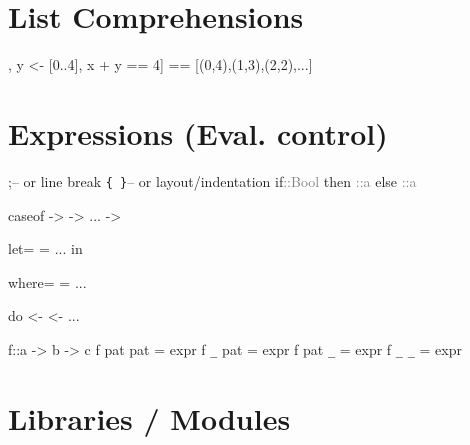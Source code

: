 \documentclass{refcard}
\begin{document}
\section{List Comprehensions}

\begin{ldesc}
	\li[pairs where sum=4] [(x,y) | \li
	                       \s\s{}x <- [0..4], \li
						   \s\s{}y <- [0..4], \li
						   \s\s{}x + y == 4]  \li
	                       == [(0,4),(1,3),(2,2),...]
\end{ldesc}


\vspace{45mm} %


\section{Expressions (Eval. control)}

\begin{ldesc}
	         ;\s\s\s\s-- or line break
	          \verb+{ }+\s\s-- or layout/indentation
	\li
	\li[if expression]
		if\s{}\s\textcolor{gray}{::\s{}Bool} \li
		\s\s{}then\s{} \textcolor{gray}{::\s{}a} \li
		\s\s{}else\s{} \textcolor{gray}{::\s{}a} \li

		case\s{}\s{}of     \li
		\s\s{}\s->\s{}   \li
		\s\s{}\s->\s{}   \li
		\s\s... \li
		\s\s{}\I{\_}\s->\s{}   \li

		let\s{}= \li
		\s\s\s\s{}= \li
		\s\s\s\s... \li
		in\s{} \li

		 \li
		where\s{}= \li
		\s\s\s\s\s\s{}= \li
		\s\s\s\s\s\s... \li

	\li[do notation]
		do       \li
		\s\s\s{} <-  \li
		\s\s\s{} \li
		\s\s\s{} <-  \li
		\s\s\s{}... \li

		f\s::\s{}a -> b -> c 
		f pat pat = expr \li
		f \verb+_+\s\s{} pat = expr \li
		f pat \verb+_+\s\s{} = expr \li
		f \verb+_+\s\s{} \verb+_+\s\s{} = expr
\end{ldesc}


\section{Libraries / Modules}
\end{document}
